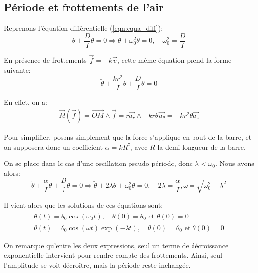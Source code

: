 \documentclass[12pt]{article}
\newcommand{\ut}{\vec{u_\theta}}
\newcommand{\ur}{\vec{u_r}}
\newcommand{\uz}{\vec{u_z}}
\begin{document}
\break
\subsection{Période et frottements de l'air}
\label{section:periode}
Reprenons l'équation différentielle (\ref{eqn:equa_diff}):
\begin{equation}
    \ddot \theta + \frac{D}{I}\theta = 0 \Rightarrow \ddot \theta + \omega_0^2 \theta = 0, \quad \omega_0^2 = \frac{D}{I}
    \label{eqn:sans_frottements}
\end{equation}


En présence de frottements $\vec{f} = -k \vec{v}$, cette même équation prend la forme suivante:
\begin{equation}
    \ddot \theta + \frac{k r^2}{I} \dot \theta + \frac{D}{I}\theta = 0
\end{equation}

En effet, on a:
\begin{align}
    \vec{M}(\vec{f}) = \vec{OM} \wedge \vec{f} = r\ur \wedge -k r \dot \theta \ut = -k r^2 \dot \theta \uz
\end{align}

Pour simplifier, posons simplement que la force s'applique en bout de la barre, et on supposera donc un coefficient 
$\alpha = k R^2$, avec $R$ la demi-longueur de la barre.

On se place dans le cas d'une oscillation pseudo-période, donc $\lambda < \omega_0$. Nous avons alors:
\begin{equation}
    \ddot \theta + \frac{\alpha}{I} \dot \theta + \frac{D}{I}\theta = 0 \Rightarrow \ddot \theta + 2\lambda \dot \theta + \omega_0^2\theta = 0, \quad 2\lambda = \frac{\alpha}{I}, \omega = \sqrt{\omega_0^2 - \lambda^2} 
    \label{eqn:avec_frottements}
\end{equation}

Il vient alors que les solutions de ces équations sont:
\begin{align}
    \theta(t) = \theta_0 \cos(\omega_0 t), \quad \theta(0) = \theta_0 \text{ et } \dot \theta(0) = 0 \\
    \theta(t) = \theta_0 \cos(\omega t) \exp(-\lambda t), \quad \theta(0) = \theta_0 \text{ et } \dot \theta(0) = 0
\end{align}

On remarque qu'entre les deux expressions, seul un terme de décroissance exponentielle intervient pour rendre compte des frottements.
Ainsi, seul l'amplitude se voit décroître, mais la période reste inchangée.
\end{document}
